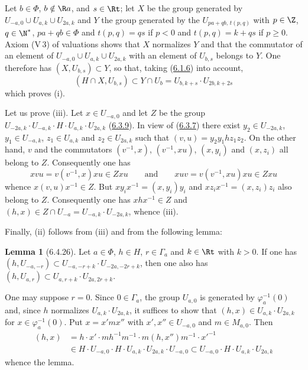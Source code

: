 \documentclass[12pt,a4paper,oneside,english]{smfart}
\makeatletter
\newcommand{\btanchor}[1]{\leavevmode\Hy@raisedlink{\hypertarget{bt:#1}{}}}
\newcommand{\btpageanchor}[1]{\Hy@raisedlink{\hypertarget{p:#1}{}}}
\newcommand{\btref}[1]{\hyperlink{bt:#1}{#1}}
\newcommand{\btpage}[1]{\marginnote{p.~#1}\btpageanchor{#1}}
\newcommand{\pmark}[1]{\btpage{#1}}
\theoremstyle{definition}
\theoremstyle{bt}
\newtheorem{lem}{Lemma}
\makeatother
\begin{document}
Let $b\in\Phi$, $b\notin\R a$, and $s\in\Rt$; let $X$ be the group
generated by $U_{-a,0}\cup U_{a,k}\cup U_{2a,k}$ and $Y$ the group
generated by the $U_{pa+qb,\,t(p,q)}$ with $p\in\Z$, $q\in\N^{*}$,
$pa+qb\in\Phi$ and $t(p,q)=qs$ if $p<0$ and $t(p,q)=k+qs$ if $p\geq0$.
Axiom (V\,3) of valuations shows that $X$ normalizes $Y$ and that the
commutator of an element of $U_{-a,0}\cup U_{a,k}\cup U_{2a,k}$ with an
element of $U_{b,s}$ belongs to $Y$. One therefore has
$(X,U_{b,s})\subset Y$, so that, taking (\btref{6.1.6}) into account,
\[
  (H\cap X,U_{b,s})\subset Y\cap U_b=U_{b,k+s}\cdot U_{2b,k+2s}
\]
which proves (i).

Let us prove (iii). Let $x\in U_{-a,0}$ and let $Z$ be the group
$U_{-2a,k}\cdot U_{-a,k}\cdot H\cdot U_{a,k}\cdot U_{2a,k}$ (\btref{6.3.9}). In
view of (\btref{6.3.7}) there exist $y_2\in U_{-2a,k}$, $y_1\in U_{-a,k}$,
$z_1\in U_{a,k}$ and $z_2\in U_{2a,k}$ such that
\pmark{144}
$(v,u)=y_2y_1hz_1z_2$. On the other hand, $v$ and the commutators
$(v^{-1},x)$, $(v^{-1},xu)$, $(x,y_i)$ and $(x,z_i)$ all belong to $Z$.
Consequently one has
\[
  xvu=v(v^{-1},x)xu\in Zxu\qquad\text{and}\qquad xuv=v(v^{-1},xu)xu\in Zxu
\]
whence $x(v,u)x^{-1}\in Z$. But $xy_ix^{-1}=(x,y_i)y_i$ and
$xz_ix^{-1}=(x,z_i)z_i$ also belong to $Z$. Consequently one has
$xhx^{-1}\in Z$ and
$(h,x)\in Z\cap U_{-a}=U_{-a,k}\cdot U_{-2a,k}$, whence (iii).

Finally, (ii) follows from (iii) and from the following lemma:

\begin{lem}[6.4.26]\btanchor{6.4.26}
Let $a\in\Phi$, $h\in H$, $r\in\Gamma_a$ and $k\in\Rt$ with $k>0$. If one
has $(h,U_{-a,-r})\subset U_{-a,-r+k}\cdot U_{-2a,-2r+k}$, then one also
has $(h,U_{a,r})\subset U_{a,r+k}\cdot U_{2a,2r+k}$.
\end{lem}

One may suppose $r=0$. Since $0\in\Gamma_a$, the group $U_{a,0}$ is
generated by $\varphi_a^{-1}(0)$ and, since $h$ normalizes
$U_{a,k}\cdot U_{2a,k}$, it suffices to show that
$(h,x)\in U_{a,k}\cdot U_{2a,k}$ for $x\in\varphi_a^{-1}(0)$. Put
$x=x'mx''$ with $x',x''\in U_{-a,0}$ and $m\in M_{a,0}$. Then
\begin{align*}
  (h,x)&=h\cdot x'\cdot mh^{-1}m^{-1}\cdot m(h,x'')m^{-1}\cdot x'^{-1}\\
   &\in H\cdot U_{-a,0}\cdot H\cdot U_{a,k}\cdot U_{2a,k}\cdot U_{-a,0}
   \subset U_{-a,0}\cdot H\cdot U_{a,k}\cdot U_{2a,k}
\end{align*}
whence the lemma.
\end{document}
